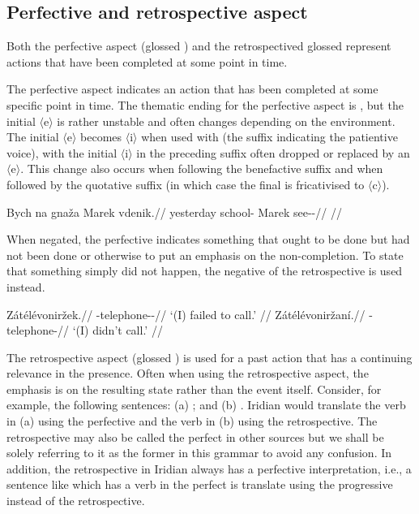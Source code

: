 \subsection{Perfective and retrospective aspect}\label{sec:perfective-retrospective}

Both the perfective aspect (glossed \Pf{}) and the retrospectived {glossed \Ret{}} represent actions that have been completed at some point in time.

The perfective aspect indicates an action that has been completed at some specific point in time. The thematic ending for the perfective aspect is , but the initial $\langle$e$\rangle$ is rather unstable and often changes depending on the environment. The initial $\langle$e$\rangle$ becomes $\langle$i$\rangle$ when used with  (the suffix indicating the patientive voice), with the initial $\langle$i$\rangle$ in the preceding suffix often dropped or replaced by an $\langle$e$\rangle$. This change also occurs when following the benefactive suffix  and when followed by the quotative suffix  (in which case the final  is fricativised to $\langle$c$\rangle$).

\pex
\begingl
\gla Bych na gnaža Marek vdenik.//
\glb yesterday \Loc{} school-\Acc{} Marek see-\Pv{}-\Pf{}//
\glft {}//
\endgl
\xe

When negated, the perfective indicates something that ought to be done but had not been done or otherwise to put an emphasis on the non-completion. To state that something simply did not happen, the negative of the retrospective is used instead.

\begin{multicols}{2}
\pex
\a\begingl
\gla Zátélévoniržek.//
\glb \Neg{}-telephone-\Av{}-\Pf{}//
\glft `(I) failed to call.' //
\endgl
\a\begingl
\gla Zátélévoniržaní.//
\glb \Neg{}-telephone-//
\glft `(I) didn't call.' //
\endgl
\xe
\end{multicols}

\par The retrospective aspect (glossed ) is used for a past action that has a continuing relevance in the presence. Often when using the retrospective aspect, the emphasis is on the resulting state rather than the event itself. Consider, for example, the following sentences: (a) ; and (b) . Iridian would translate the verb in (a) using the perfective and the verb in (b) using the retrospective. The retrospective may also be called the {\cscaps perfect} in other sources but we shall be solely referring to it as the former in this grammar to avoid any confusion. In addition, the retrospective in Iridian always has a perfective interpretation, i.e., a sentence like  which has a verb in the perfect is translate using the progressive instead of the retrospective.

